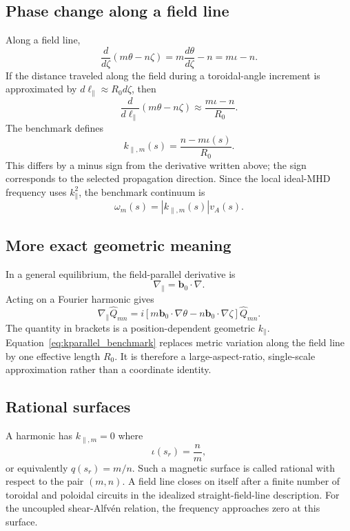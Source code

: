 \subsection{Phase change along a field line}
Along a field line,
\begin{equation}
\frac{d}{d\zeta}(m\theta-n\zeta)=m\frac{d\theta}{d\zeta}-n=m\iota-n.
\end{equation}
If the distance traveled along the field during a toroidal-angle increment is approximated by $d\ell_\parallel\approx R_0d\zeta$, then
\begin{equation}
\frac{d}{d\ell_\parallel}(m\theta-n\zeta)
\approx\frac{m\iota-n}{R_0}.
\end{equation}
The benchmark defines
\begin{equation}
\boxed{k_{\parallel,m}(s)=\frac{n-m\iota(s)}{R_0}.}
\label{eq:kparallel_benchmark}
\end{equation}
This differs by a minus sign from the derivative written above; the sign corresponds to the selected propagation direction. Since the local ideal-MHD frequency uses $k_\parallel^2$, the benchmark continuum is
\begin{equation}
\omega_m(s)=|k_{\parallel,m}(s)|v_A(s).
\end{equation}

\subsection{More exact geometric meaning}
In a general equilibrium, the field-parallel derivative is
\begin{equation}
\nabla_\parallel=\mathbf b_0\cdot\nabla.
\end{equation}
Acting on a Fourier harmonic gives
\begin{equation}
\nabla_\parallel\widehat Q_{mn}
=i\left[m\mathbf b_0\cdot\nabla\theta-n\mathbf b_0\cdot\nabla\zeta\right]\widehat Q_{mn}.
\label{eq:exact_parallel_derivative}
\end{equation}
The quantity in brackets is a position-dependent geometric $k_\parallel$. Equation~\eqref{eq:kparallel_benchmark} replaces metric variation along the field line by one effective length $R_0$. It is therefore a large-aspect-ratio, single-scale approximation rather than a coordinate identity.

\subsection{Rational surfaces}
A harmonic has $k_{\parallel,m}=0$ where
\begin{equation}
\iota(s_r)=\frac{n}{m},
\label{eq:rational_surface}
\end{equation}
or equivalently $q(s_r)=m/n$. Such a magnetic surface is called rational with respect to the pair $(m,n)$. A field line closes on itself after a finite number of toroidal and poloidal circuits in the idealized straight-field-line description. For the uncoupled shear-Alfv\'en relation, the frequency approaches zero at this surface.

